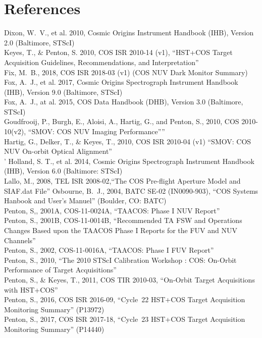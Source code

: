 \documentclass{stsci_report}
\newcommand{\pid}[1]{{\rm P}#1}
\begin{document}
\section{References}\label{sec:References}
\vspace{0.3cm}
\small
Dixon, W.~V., et al. 2010, Cosmic Origins Instrument Handbook (IHB), Version 2.0 (Baltimore, STScI)\\
Keyes, T., \& Penton, S. 2010, COS ISR 2010-14 (v1), ``HST+COS Target Acquisition Guidelines, Recommendations, and Interpretation''\\
Fix, M.~B., 2018, COS ISR 2018-03 (v1) (COS NUV Dark Monitor Summary)\\
Fox, A.~J., et al. 2017, Cosmic Origins Spectrograph Instrument Handbook (IHB), Version 9.0 (Baltimore, STScI)\\
Fox, A.~J., at al. 2015, COS Data Handbook (DHB), Version 3.0 (Baltimore, STScI)\\
Goudfrooij, P., Burgh, E., Aloisi, A., Hartig, G., and Penton, S., 2010, COS 2010-10(v2), ``SMOV: COS NUV Imaging Performance''''\\
Hartig, G., Delker, T., \& Keyes, T., 2010, COS ISR 2010-04 (v1) ``SMOV: COS NUV On-orbit Optical Alignment''\\'
Holland, S. T., et al. 2014, Cosmic Origins Spectrograph Instrument Handbook (IHB), Version 6.0 (Baltimore: STScI)\\
Lallo, M., 2008, TEL ISR 2008-02,``The COS Pre-flight Aperture Model and SIAF.dat File''
Osbourne, B.~J., 2004, BATC SE-02 (IN0090-903), ``COS Systems Hanbook and User's Manuel'' (Boulder, CO: BATC)\\
Penton, S,, 2001A, COS-11-0024A, ``TAACOS: Phase I NUV Report''\\
Penton, S., 2001B, COS-11-0014B, ``Recommended TA FSW and Operations Changes Based upon the TAACOS Phase I Reports for the FUV and NUV Channels''\\
Penton, S., 2002, COS-11-0016A, ``TAACOS: Phase I FUV Report''\\
Penton, S., 2010, ``The 2010 STScI Calibration Workshop : COS: On-Orbit Performance of Target Acquisitions''\\
Penton, S., \& Keyes, T., 2011, COS TIR 2010-03, ``On-Orbit Target Acquisitions with HST+COS''\\
Penton, S., 2016, COS ISR 2016-09, ``Cycle~22 HST+COS Target Acquisition Monitoring Summary'' (\pid{13972})\\
Penton, S., 2017, COS ISR 2017-18, ``Cycle~23 HST+COS Target Acquisition Monitoring Summary'' (\pid{14440})\\
\end{document}
